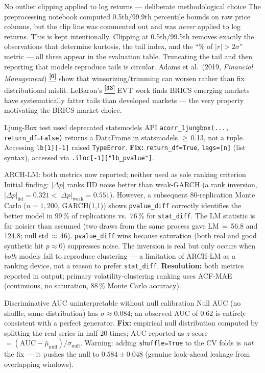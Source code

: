 \documentclass[10pt]{article}
\newcommand{\tcite}[1]{%
  \hyperlink{R:#1}{\textsuperscript{\scriptsize\textbf{[#1]}}}}
\begin{document}
%
  {No outlier clipping applied to log returns --- deliberate methodological choice}%
  {The preprocessing notebook computed 0.5th/99.9th percentile bounds on raw price columns, but the clip line was commented out and was \emph{never} applied to log returns. This is kept intentionally. Clipping at 0.5th/99.5th removes exactly the observations that determine kurtosis, the tail index, and the ``\% of $|r|>2\sigma$'' metric --- all three appear in the evaluation table. Truncating the tail and then reporting that models reproduce tails is circular. Adams et al.\ (2019, \textit{Financial Management})\tcite{6} show that winsorizing/trimming can worsen rather than fix distributional misfit. LeBaron's\tcite{33} EVT work finds BRICS emerging markets have systematically fatter tails than developed markets --- the very property motivating the BRICS market choice.}

%
  {Ljung-Box test used deprecated statsmodels API}%
  {\texttt{acorr\_ljungbox(..., return\_df=False)} returns a DataFrame in statsmodels $\geq$\,0.13, not a tuple. Accessing \texttt{lb[1][-1]} raised \texttt{TypeError}. \textbf{Fix:} \texttt{return\_df=True}, \texttt{lags=[n]} (list syntax), accessed via \texttt{.iloc[-1]["lb\_pvalue"]}.}

%
  {ARCH-LM: both metrics now reported; neither used as sole ranking criterion}%
  {Initial finding: $|\Delta p|$ ranks IID noise better than weak-GARCH (a rank inversion, $|\Delta p|_\text{iid}=0.321 < |\Delta p|_\text{weak}=0.551$). However, a subsequent 80-replication Monte Carlo ($n=1{,}200$, GARCH(1,1)) shows \texttt{pvalue\_diff} correctly identifies the better model in 99\,\% of replications vs.\ 76\,\% for \texttt{stat\_diff}. The LM statistic is far noisier than assumed (two draws from the same process gave LM\,$=$\,56.8 and 124.8; null std\,$\approx$\,46). \texttt{pvalue\_diff} wins because saturation (both real and good synthetic hit $p\approx 0$) suppresses noise. The inversion is real but only occurs when \emph{both} models fail to reproduce clustering --- a limitation of ARCH-LM as a ranking device, not a reason to prefer \texttt{stat\_diff}. \textbf{Resolution:} both metrics reported in output; primary volatility-clustering ranking uses ACF-MAE (continuous, no saturation, 88\,\% Monte Carlo accuracy).}

%
  {Discriminative AUC uninterpretable without null calibration}%
  {Null AUC (no shuffle, same distribution) has $\sigma \approx 0.084$; an observed AUC of 0.62 is entirely consistent with a perfect generator. \textbf{Fix:} empirical null distribution computed by splitting the real series in half 20 times; AUC reported as $z$-score $= (\text{AUC} - \bar{\mu}_\text{null})/\sigma_\text{null}$. Warning: adding \texttt{shuffle=True} to the CV folds is \emph{not} the fix --- it pushes the null to $0.584 \pm 0.048$ (genuine look-ahead leakage from overlapping windows).}
\end{document}
